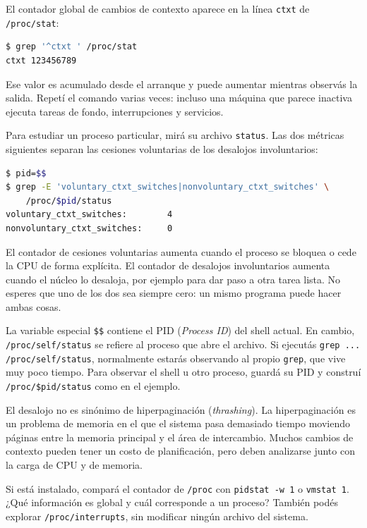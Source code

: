 \documentclass[11pt,a4paper]{article}
\begin{document}
El contador global de cambios de contexto aparece en la línea \texttt{ctxt}
de \texttt{/proc/stat}:

\begin{lstlisting}[language=bash]
$ grep '^ctxt ' /proc/stat
ctxt 123456789
\end{lstlisting}

Ese valor es acumulado desde el arranque y puede aumentar mientras observás
la salida. Repetí el comando varias veces: incluso una máquina que parece
inactiva ejecuta tareas de fondo, interrupciones y servicios.

Para estudiar un proceso particular, mirá su archivo \texttt{status}. Las
dos métricas siguientes separan las cesiones voluntarias de los desalojos
involuntarios:

\begin{lstlisting}[language=bash]
$ pid=$$
$ grep -E 'voluntary_ctxt_switches|nonvoluntary_ctxt_switches' \
    /proc/$pid/status
voluntary_ctxt_switches:        4
nonvoluntary_ctxt_switches:     0
\end{lstlisting}

El contador de cesiones voluntarias aumenta cuando el proceso se bloquea o
cede la CPU de forma explícita. El contador de desalojos involuntarios aumenta
cuando el núcleo lo desaloja, por ejemplo para dar paso a otra tarea lista. No
esperes que uno de los dos sea siempre cero: un mismo programa puede hacer
ambas cosas.

\begin{notebox}
La variable especial \texttt{\$\$} contiene el PID (\emph{Process ID}) del
shell actual. En cambio, \texttt{/proc/self/status} se refiere al proceso que
abre el archivo. Si ejecutás \texttt{grep ... /proc/self/status}, normalmente
estarás observando al propio \texttt{grep}, que vive muy poco tiempo. Para
observar el shell u otro proceso, guardá su PID y construí
\texttt{/proc/\$pid/status} como en el ejemplo.
\end{notebox}

El desalojo no es sinónimo de hiperpaginación (\emph{thrashing}). La
hiperpaginación es un problema de memoria en el que el sistema pasa demasiado
tiempo moviendo páginas entre la memoria principal y el área de intercambio.
Muchos cambios de contexto pueden tener un costo de planificación, pero deben
analizarse junto con la carga de CPU y de memoria.

\begin{extrabox}
Si está instalado, compará el contador de \texttt{/proc} con
\texttt{pidstat -w 1} o \texttt{vmstat 1}. ¿Qué información es global y cuál
corresponde a un proceso? También podés explorar \texttt{/proc/interrupts},
sin modificar ningún archivo del sistema.
\end{extrabox}
\end{document}
